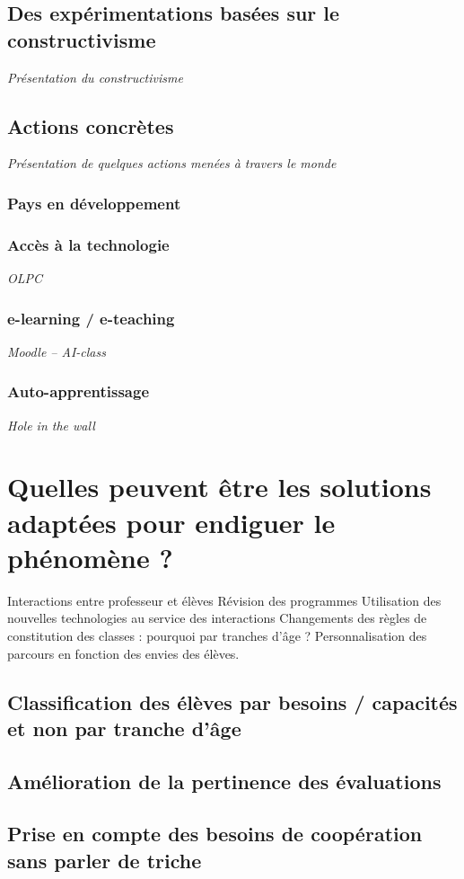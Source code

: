 \subsection{Des expérimentations basées sur le constructivisme}
\textit{Présentation du constructivisme}

\subsection{Actions concrètes}
\textit{Présentation de quelques actions menées à travers le monde}
\subsubsection{Pays en développement}
\subsubsection{Accès à la technologie}
\textit{OLPC}
\subsubsection{e-learning / e-teaching}
\textit{Moodle -- AI-class}
\subsubsection{Auto-apprentissage}
\textit{Hole in the wall}

\section{Quelles peuvent être les solutions adaptées pour endiguer le phénomène ?}\label{solutions}

Interactions entre professeur et élèves
Révision des programmes
Utilisation des nouvelles technologies au service des interactions
Changements des règles de constitution des classes : pourquoi par tranches d'âge ?
Personnalisation des parcours en fonction des envies des élèves.

\subsection{Classification des élèves par besoins / capacités  et non par tranche d'âge}
\subsection{Amélioration de la pertinence des évaluations}
\subsection{Prise en compte des besoins de coopération sans parler de triche}

